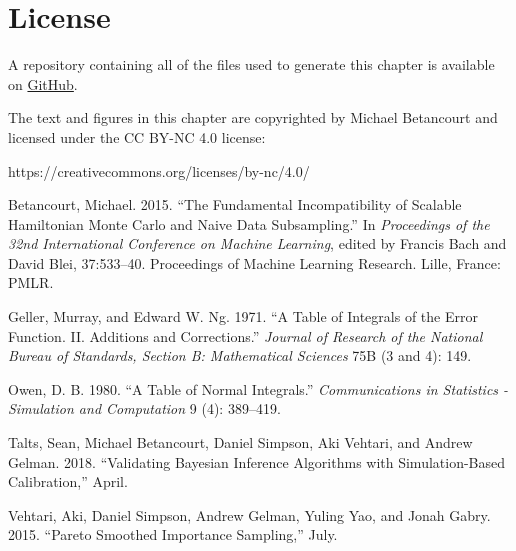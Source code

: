 \documentclass[
  letterpaper,
  DIV=11,
  numbers=noendperiod]{scrartcl}
\newlength{\cslhangindent}
\newenvironment{CSLReferences}[2] %
 {\begin{list}{}{%
  \setlength{\itemindent}{0pt}
  \setlength{\leftmargin}{0pt}
  \setlength{\parsep}{0pt}
  \ifodd #1
   \setlength{\leftmargin}{\cslhangindent}
   \setlength{\itemindent}{-1\cslhangindent}
  \fi
  \setlength{\itemsep}{#2\baselineskip}}}
 {\end{list}}
\begin{document}
\section*{License}\label{license}

A repository containing all of the files used to generate this chapter
is available on
\href{https://github.com/betanalpha/quarto_chapters/tree/main/misc/modeling_selection}{GitHub}.

The text and figures in this chapter are copyrighted by Michael
Betancourt and licensed under the CC BY-NC 4.0 license:

https://creativecommons.org/licenses/by-nc/4.0/

\label{refs}
\begin{CSLReferences}{1}{0}
Betancourt, Michael. 2015. {``The Fundamental Incompatibility of
Scalable Hamiltonian Monte Carlo and Naive Data Subsampling.''} In
\emph{Proceedings of the 32nd International Conference on Machine
Learning}, edited by Francis Bach and David Blei, 37:533--40.
Proceedings of Machine Learning Research. Lille, France: PMLR.

Geller, Murray, and Edward W. Ng. 1971. {``A Table of Integrals of the
Error Function. II. Additions and Corrections.''} \emph{Journal of
Research of the National Bureau of Standards, Section B: Mathematical
Sciences} 75B (3 and 4): 149.

Owen, D. B. 1980. {``A Table of Normal Integrals.''}
\emph{Communications in Statistics - Simulation and Computation} 9 (4):
389--419.

Talts, Sean, Michael Betancourt, Daniel Simpson, Aki Vehtari, and Andrew
Gelman. 2018. {``Validating Bayesian Inference Algorithms with
Simulation-Based Calibration,''} April.

Vehtari, Aki, Daniel Simpson, Andrew Gelman, Yuling Yao, and Jonah
Gabry. 2015. {``Pareto Smoothed Importance Sampling,''} July.

\end{CSLReferences}
\end{document}
